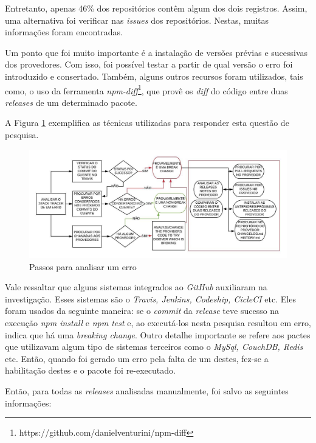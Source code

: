 Entretanto, apenas 46\% dos repositórios contêm algum dos dois registros. Assim, uma alternativa foi verificar nas \textit{issues} dos repositórios. Nestas, muitas informações foram encontradas.

Um ponto que foi muito importante é a instalação de versões prévias e sucessivas dos provedores. Com isso, foi possível testar a partir de qual versão o erro foi introduzido e consertado. Também, alguns outros recursos foram utilizados, tais como, o uso da ferramenta \textit{npm-diff}\footnote{https://github.com/danielventurini/npm-diff}, que provê os \textit{diff} do código entre duas \textit{releases} de um determinado pacote.

A Figura \ref{fig:step_analyze} exemplifica as técnicas utilizadas para responder esta questão de pesquisa.

\begin{figure}
    \centering
    \includegraphics[scale=0.73]{figuras/step_analyze_pt.jpeg}
    \caption{Passos para analisar um erro}
    \label{fig:step_analyze}
\end{figure}

Vale ressaltar que alguns sistemas integrados ao \textit{GitHub} auxiliaram na investigação. Esses sistemas são o \textit{Travis, Jenkins, Codeship, CicleCI} etc. Eles foram usados da seguinte maneira: se o \textit{commit} da \textit{release} teve sucesso na execução \textit{npm install} e \textit{npm test} e, ao executá-los nesta pesquisa resultou em erro, indica que há uma \textit{breaking change}. Outro detalhe importante se refere aos pactes que utilizavam algum tipo de sistemas terceiros como o \textit{MySql, CouchDB, Redis} etc. Então, quando foi gerado um erro pela falta de um destes, fez-se a habilitação destes e o pacote foi re-executado.

Então, para todas as \textit{releases} analisadas manualmente, foi salvo as seguintes informações:

